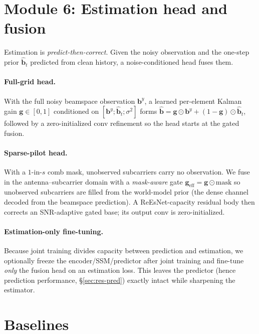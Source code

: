 \documentclass[11pt]{article}
\newcommand{\bs}{\mathbf{b}}
\begin{document}
\section{Module 6: Estimation head and fusion}\label{sec:heads}

Estimation is \emph{predict-then-correct}. Given the noisy observation and the one-step prior
$\hat{\bs}_t$ predicted from clean history, a noise-conditioned head fuses them.

\paragraph{Full-grid head.} With the full noisy beamspace observation $\bs^y$, a learned per-element
Kalman gain $\mathbf g\in[0,1]$ conditioned on $[\bs^y;\hat{\bs}_t;\sigma^2]$ forms
$\hat{\bs}=\mathbf g\odot\bs^y+(1-\mathbf g)\odot\hat{\bs}_t$, followed by a zero-initialized conv
refinement so the head starts at the gated fusion.

\paragraph{Sparse-pilot head.} With a $1$-in-$s$ comb mask, unobserved subcarriers carry no
observation. We fuse in the antenna--subcarrier domain with a \emph{mask-aware} gate
$\mathbf g_{\text{eff}}=\mathbf g\odot\text{mask}$ so unobserved subcarriers are filled from the
world-model prior (the dense channel decoded from the beamspace prediction). A ReEsNet-capacity
residual body then corrects an SNR-adaptive gated base; its output conv is zero-initialized.

\paragraph{Estimation-only fine-tuning.} Because joint training divides capacity between prediction
and estimation, we optionally freeze the encoder/SSM/predictor after joint training and fine-tune
\emph{only} the fusion head on an estimation loss. This leaves the predictor (hence prediction
performance, \S\ref{sec:res-pred}) exactly intact while sharpening the estimator.

\section{Baselines}\label{sec:baselines}
\end{document}
